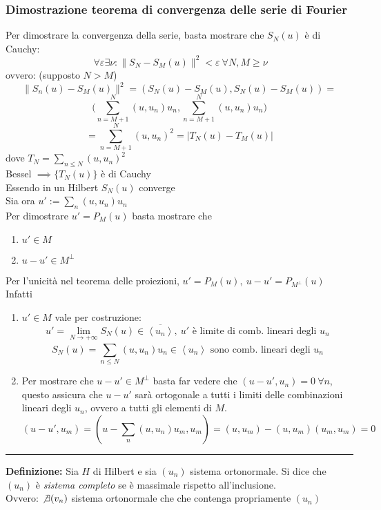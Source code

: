 \documentclass[a4paper]{article}
\newcommand{\divider}{\noindent\rule{\textwidth}{0.5pt}}
\begin{document}
\subsubsection{Dimostrazione teorema di convergenza delle serie di Fourier}
Per dimostrare la convergenza della serie, basta mostrare che $S_N(u)$ è di Cauchy:
\[\ \forall \varepsilon\exists \nu:\|S_N-S_M(u)\|^2<\varepsilon\ \forall N,M\ge \nu\]
ovvero: (supposto $N>M$)
\[\|S_n(u)-S_M(u)\|^2=(S_N(u)-S_M(u),S_N(u)-S_M(u))=\]
\[\bigg(\sum_{n=M+1}^{N} (u,u_n)u_n,\sum_{n=M+1}^{N} (u,u_n)u_n\bigg)\]
\[=\sum_{n=M+1}^{N} (u,u_n)^2=|T_N(u)-T_M(u)|\]
dove $T_N=\sum_{n\le N}^{} (u,u_n)^2$\\ 
Bessel $\implies \{T_N(u)\} $ è di Cauchy
\\Essendo in un Hilbert $S_N(u)$ converge
\\Sia ora $u':=\sum_{n}^{} (u,u_n)u_n$ 
\\Per dimostrare $u'=P_M(u)$ basta mostrare che
\begin{enumerate}
	\item $u'\in M$ 
	\item $u-u'\in M^\perp$
\end{enumerate}
Per l'unicità nel teorema delle proiezioni, $u'=P_M(u),\ u-u'=P_{M^\perp}(u)$
\\Infatti
\begin{enumerate}
	\item $u'\in M$ vale per costruzione:
		\[u'=\lim_{N \to +\infty} S_N(u)\in \overline{\left< u_n \right> },\ u'\text{ è limite di comb. lineari degli }u_n \] \[ S_N(u)=\sum_{n\le N}^{} (u,u_n)u_n \in \left< u_n \right> \text{ sono comb. lineari degli }u_n\]
	\item Per mostrare che $u-u'\in M^\perp$ basta far vedere che $(u-u',u_n)=0\ \forall n$, questo assicura che $u-u'$ sarà ortogonale a tutti i limiti delle combinazioni lineari degli $u_n$, ovvero a tutti gli elementi di $M$.\[(u-u',u_m)=(u-\sum_{n}^{} (u,u_n)u_m,u_m)=(u,u_m)-(u,u_m)(u_m,u_m)=0\]
\end{enumerate}
\divider
\begin{tcolorbox}
	\textbf{Definizione: }Sia $H$ di Hilbert e sia $(u_n)$ sistema ortonormale. 
	Si dice che $(u_n)$ è \emph{sistema completo} se è massimale rispetto all'inclusione.
	\\Ovvero: $\not\exists (v_n)$ sistema ortonormale che che contenga propriamente $(u_n)$
\end{tcolorbox}
\end{document}
